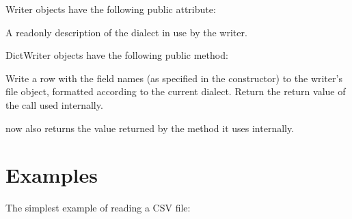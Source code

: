 \documentclass[letterpaper,10pt,english]{sphinxmanual}
\begin{document}
Writer objects have the following public attribute:

\begin{fulllineitems}
\label{\detokenize{csv:csv.csvwriter.dialect}}
A read\sphinxhyphen{}only description of the dialect in use by the writer.

\end{fulllineitems}


DictWriter objects have the following public method:

\begin{fulllineitems}
\label{\detokenize{csv:csv.DictWriter.writeheader}}
Write a row with the field names (as specified in the constructor) to
the writer’s file object, formatted according to the current dialect. Return
the return value of the {\hyperref[\detokenize{csv:csv.csvwriter.writerow}]{}} call used internally.


 now also returns the value returned by
the {\hyperref[\detokenize{csv:csv.csvwriter.writerow}]{}} method it uses internally.

\end{fulllineitems}



\section{Examples}
\label{\detokenize{csv:examples}}\label{\detokenize{csv:csv-examples}}
The simplest example of reading a CSV file:

\begin{sphinxVerbatim}[commandchars=\\\{\}]
 
    
      
       
\end{sphinxVerbatim}
\end{document}
